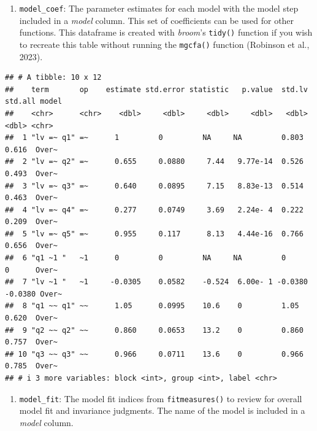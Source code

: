 \documentclass[
  man,floatsintext]{apa7}
\newenvironment{Shaded}{\begin{snugshade}}{\end{snugshade}}
\newcommand{\DecValTok}[1]{\textcolor[rgb]{0.00,0.00,0.81}{#1}}
\newcommand{\NormalTok}[1]{#1}
\newcommand{\SpecialCharTok}[1]{\textcolor[rgb]{0.81,0.36,0.00}{\textbf{#1}}}
\providecommand{\tightlist}{%
  \setlength{\itemsep}{0pt}\setlength{\parskip}{0pt}}
\begin{document}
\begin{enumerate}
\def\labelenumi{\arabic{enumi})}
\tightlist
\item
  \texttt{model\_coef}: The parameter estimates for each model with the model step included in a \emph{model} column. This set of coefficients can be used for other functions. This dataframe is created with \emph{broom}'s \texttt{tidy()} function if you wish to recreate this table without running the \texttt{mgcfa()} function (Robinson et al., 2023).
\end{enumerate}

\small

\begin{Shaded}
\end{Shaded}

\normalsize

\begin{verbatim}
## # A tibble: 10 x 12
##    term       op    estimate std.error statistic   p.value  std.lv std.all model
##    <chr>      <chr>    <dbl>     <dbl>     <dbl>     <dbl>   <dbl>   <dbl> <chr>
##  1 "lv =~ q1" =~      1         0         NA     NA         0.803   0.616  Over~
##  2 "lv =~ q2" =~      0.655     0.0880     7.44   9.77e-14  0.526   0.493  Over~
##  3 "lv =~ q3" =~      0.640     0.0895     7.15   8.83e-13  0.514   0.463  Over~
##  4 "lv =~ q4" =~      0.277     0.0749     3.69   2.24e- 4  0.222   0.209  Over~
##  5 "lv =~ q5" =~      0.955     0.117      8.13   4.44e-16  0.766   0.656  Over~
##  6 "q1 ~1 "   ~1      0         0         NA     NA         0       0      Over~
##  7 "lv ~1 "   ~1     -0.0305    0.0582    -0.524  6.00e- 1 -0.0380 -0.0380 Over~
##  8 "q1 ~~ q1" ~~      1.05      0.0995    10.6    0         1.05    0.620  Over~
##  9 "q2 ~~ q2" ~~      0.860     0.0653    13.2    0         0.860   0.757  Over~
## 10 "q3 ~~ q3" ~~      0.966     0.0711    13.6    0         0.966   0.785  Over~
## # i 3 more variables: block <int>, group <int>, label <chr>
\end{verbatim}

\begin{enumerate}
\def\labelenumi{\arabic{enumi})}
\setcounter{enumi}{1}
\tightlist
\item
  \texttt{model\_fit}: The model fit indices from \texttt{fitmeasures()} to review for overall model fit and invariance judgments. The name of the model is included in a \emph{model} column.
\end{enumerate}
\end{document}
